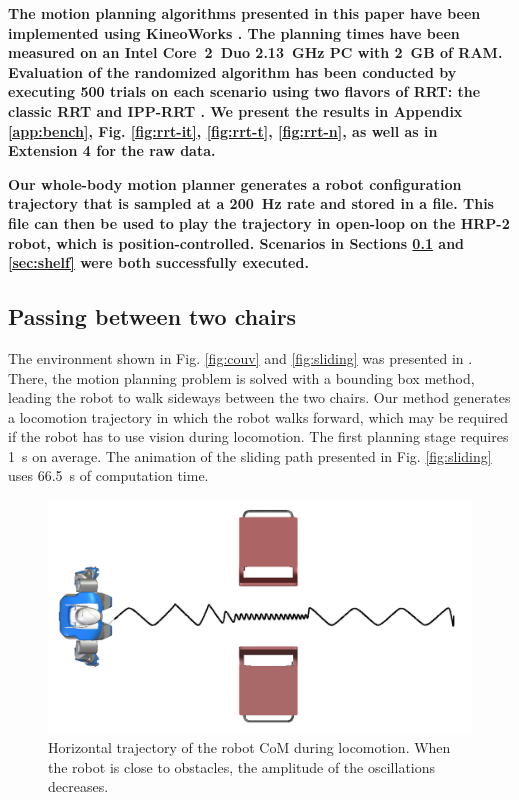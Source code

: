\documentclass{article}
\begin{document}
\textbf{The motion planning algorithms presented in this paper have
  been implemented using KineoWorks\texttrademark
  \cite{laumond2006kcs}. The planning times have been measured on an
  Intel Core~2~Duo 2.13~GHz PC with 2~GB of RAM. Evaluation of the
  randomized algorithm has been conducted by executing 500 trials on
  each scenario using two flavors of RRT: the classic RRT and IPP-RRT
  \cite{FERR04A}. We present the results in Appendix \ref{app:bench},
  Fig. \ref{fig:rrt-it}, \ref{fig:rrt-t}, \ref{fig:rrt-n}, as well as
  in Extension 4 for the raw data.}

\textbf{Our whole-body motion planner generates a robot configuration
  trajectory that is sampled at a 200~Hz rate and stored in a
  file. This file can then be used to play the trajectory in open-loop
  on the HRP-2 robot, which is position-controlled. Scenarios in
  Sections \ref{sec:chairs} and \ref{sec:shelf} were both successfully
  executed.}

\subsection{Passing between two chairs}
\label{sec:chairs}

The environment shown in Fig. \ref{fig:couv} and \ref{fig:sliding} was presented
in \cite{el2011path}. There, the motion planning problem is solved with a bounding
box method, leading the robot to walk sideways between the two chairs.
Our method generates a locomotion  trajectory in which the robot walks
forward, which may be required if the robot has to use vision during
locomotion. The first planning stage  requires 1~s
on  average.   The  animation  of   the  sliding  path   presented  in
Fig.   \ref{fig:sliding}   uses  66.5~s  of  computation   time.


\begin{figure}[h!]
\centering
\includegraphics[width=0.7\linewidth]{pics/chairs/waist-trajectory.png}

\caption{Horizontal trajectory of the robot CoM during
  locomotion. When the robot is close to obstacles, the amplitude of
  the oscillations decreases.}
\label{fig:chairs-waist}
\end{figure}
\end{document}
